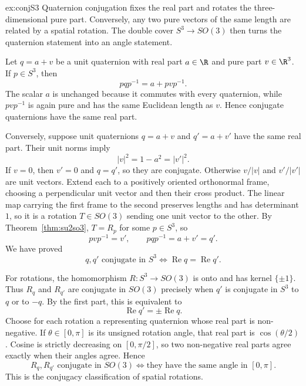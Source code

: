 \begin{solution}{ex:conjS3}
\idea Quaternion conjugation fixes the real part and rotates the three-dimensional pure part. Conversely, any two pure vectors of the same length are related by a spatial rotation. The double cover $S^3\to SO(3)$ then turns the quaternion statement into an angle statement.

\writeup Let $q=a+v$ be a unit quaternion with real part $a\in\R$ and pure part $v\in\R^3$. If $p\in S^3$, then
\[
pqp^{-1}=a+pvp^{-1}.
\]
The scalar $a$ is unchanged because it commutes with every quaternion, while $pvp^{-1}$ is again pure and has the same Euclidean length as $v$. Hence conjugate quaternions have the same real part.

Conversely, suppose unit quaternions $q=a+v$ and $q'=a+v'$ have the same real part. Their unit norms imply
\[
|v|^2=1-a^2=|v'|^2.
\]
If $v=0$, then $v'=0$ and $q=q'$, so they are conjugate. Otherwise $v/|v|$ and $v'/|v'|$ are unit vectors. Extend each to a positively oriented orthonormal frame, choosing a perpendicular unit vector and then their cross product. The linear map carrying the first frame to the second preserves lengths and has determinant $1$, so it is a rotation $T\in SO(3)$ sending one unit vector to the other. By Theorem~\ref{thm:su2so3}, $T=R_p$ for some $p\in S^3$, so
\[
pvp^{-1}=v',
\qquad
pqp^{-1}=a+v'=q'.
\]
We have proved
\[
\boxed{q,q'\text{ conjugate in }S^3
\iff\operatorname{Re}q=\operatorname{Re}q'}.
\]

For rotations, the homomorphism $R:S^3\to SO(3)$ is onto and has kernel $\{\pm1\}$. Thus $R_q$ and $R_{q'}$ are conjugate in $SO(3)$ precisely when $q'$ is conjugate in $S^3$ to $q$ or to $-q$. By the first part, this is equivalent to
\[
\operatorname{Re}q'=\pm\operatorname{Re}q.
\]
Choose for each rotation a representing quaternion whose real part is non-negative. If $\theta\in[0,\pi]$ is its unsigned rotation angle, that real part is $\cos(\theta/2)$. Cosine is strictly decreasing on $[0,\pi/2]$, so two non-negative real parts agree exactly when their angles agree. Hence
\[
\boxed{R_q,R_{q'}\text{ conjugate in }SO(3)
\iff\text{they have the same angle in }[0,\pi].}
\]
This is the conjugacy classification of spatial rotations.
\end{solution}

